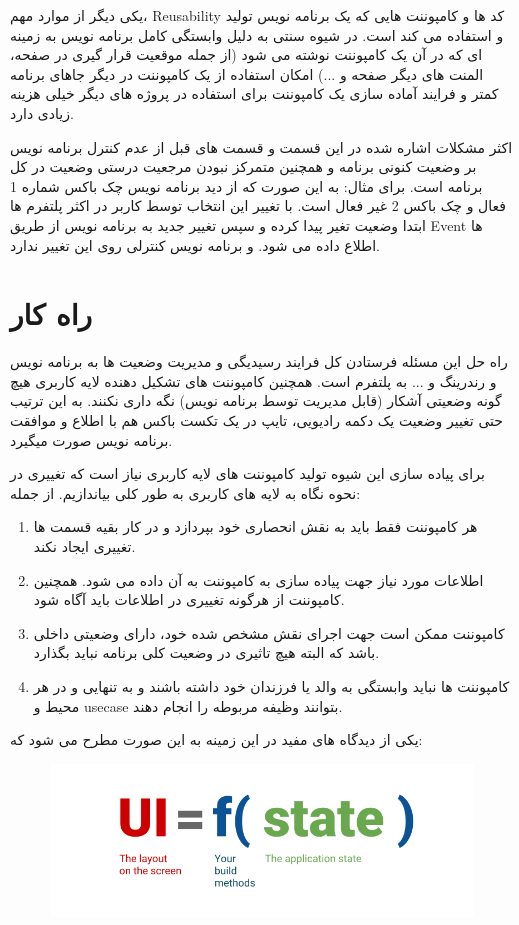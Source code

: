 \documentclass{CSICC2020}
\begin{document}
یکی دیگر از موارد مهم، Reusability کد ها و کامپوننت هایی که یک برنامه نویس تولید و استفاده می کند است. در شیوه سنتی به دلیل وابستگی کامل برنامه نویس به زمینه ای که در آن یک کامپوننت نوشته می شود (از جمله موقعیت قرار گیری در صفحه، المنت های دیگر صفحه و ...) امکان استفاده از یک کامپوننت در دیگر جاهای برنامه کمتر و فرایند آماده سازی یک کامپوننت برای استفاده در پروژه های دیگر خیلی هزینه زیادی دارد.

اکثر مشکلات اشاره شده در این قسمت و قسمت های قبل از عدم کنترل برنامه نویس بر وضعیت کنونی برنامه و همچنین متمرکز نبودن مرجعیت درستی وضعیت در کل برنامه است. 
برای مثال: به این صورت که از دید برنامه نویس چک باکس شماره 1 فعال و چک باکس 2 غیر فعال است. با تغییر این انتخاب توسط کاربر در اکثر پلتفرم ها ابتدا وضعیت تغیر پیدا کرده و سپس تغییر جدید به برنامه نویس از طریق Event ها اطلاع داده می شود. و برنامه نویس کنترلی روی این تغییر ندارد.

\section{راه کار}

راه حل این مسئله فرستادن کل فرایند رسیدیگی و مدیریت وضعیت ها به برنامه نویس و رندرینگ و ... به پلتفرم است.
همچنین کامپوننت های تشکیل دهنده لایه کاربری هیچ گونه وضعیتی آشکار (قابل مدیریت توسط برنامه نویس) نگه داری نکنند. به این ترتیب حتی تغییر وضعیت یک دکمه رادیویی، تایپ در یک تکست باکس هم با اطلاع و موافقت برنامه نویس صورت میگیرد.

برای پیاده سازی این شیوه تولید کامپوننت های لایه کاربری نیاز است که تغییری در نحوه نگاه به لایه های کاربری به طور کلی بیاندازیم. از جمله:

\begin{enumerate} 
\item هر کامپوننت فقط باید به نقش انحصاری خود بپردازد و در کار بقیه قسمت ها تغییری ایجاد نکند.
\item اطلاعات مورد نیاز جهت پیاده سازی به کامپوننت به آن داده می شود. همچنین کامپوننت از هرگونه تغییری در اطلاعات باید آگاه شود.
\item کامپوننت ممکن است جهت اجرای نقش مشخص شده خود، دارای وضعیتی داخلی باشد که البته هیچ تاثیری در وضعیت کلی برنامه نباید بگذارد.
\item کامپوننت ها نباید وابستگی به والد یا فرزندان خود داشته باشند و به تنهایی و در هر محیط و usecase بتوانند وظیفه مربوطه را انجام دهند.
\end{enumerate}

یکی از دیدگاه های مفید در این زمینه به این صورت مطرح می شود که:

\begin{figure}[h!]
\centering\includegraphics[width=\linewidth]{Images/ui_function}
\caption{}
\label{fig:UI_Func}
\end{figure}
\end{document}
